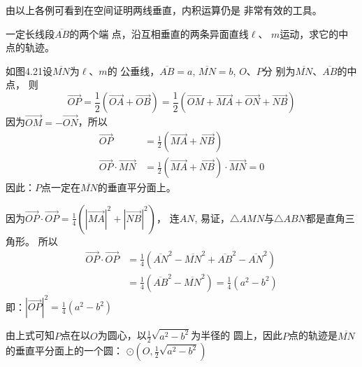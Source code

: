 由以上各例可看到在空间证明两线垂直，内积运算仍是
非常有效的工具。

\begin{example}
    一定长线段$\overline{AB}$的两个端
    点，沿互相垂直的两条异面直线$\ell$、
    $m$运动，求它的中点的轨迹。
\end{example}

\begin{solution}
    如图4.21设$\overline{MN}$为$\ell$、$m$的
公垂线，$\overline{AB}=a$, $\overline{MN}=b$, $O$、$P$分
别为$\overline{MN}$、$\overline{AB}$的中点，
则
\[\Vec{OP}=\frac{1}{2}\left(\Vec{OA}+\Vec{OB}\right)=\frac{1}{2}\left(\Vec{OM}+\Vec{MA}+\Vec{ON}+\Vec{NB}\right)\]
因为$\Vec{OM}=-\Vec{ON}$，所以
\[\begin{split}
    \Vec{OP}&=\frac{1}{2}(\Vec{MA}+\Vec{NB})\\
    \Vec{OP}\cdot\Vec{MN}&=\frac{1}{2}\left(\Vec{MA}+\Vec{NB}\right)\cdot \Vec{MN}=0
\end{split}    \]
因此：$P$点一定在$\overline{MN}$的垂直平分面上。

因为$\Vec{OP}\cdot \Vec{OP}=\frac{1}{4}(|\Vec{MA}|^2+|\Vec{NB}|^2)$，
连$AN$, 易证，$\triangle AMN$与$\triangle ABN$都是直角三角形。
所以
\[\begin{split}
    \Vec{OP}\cdot \Vec{OP}&=\frac{1}{4}\left(\overline{AN}^2-\overline{MN}^2+\overline{AB}^2-\overline{AN}^2\right)\\
    &=\frac{1}{4}\left(\overline{AB}^2-\overline{MN}^2\right)=\frac{1}{4}(a^2-b^2)
\end{split}\]
即：$|\Vec{OP}|^2=\frac{1}{4}(a^2-b^2)$

由上式可知$P$点在以$O$为圆心，以$\frac{1}{2}\sqrt{a^2-b^2}$为半径的
圆上，因此$P$点的轨迹是$\overline{MN}$的垂直平分面上的一个圆：
$\odot\left(O,\frac{1}{2}\sqrt{a^2-b^2}\right)$
\end{solution}

\begin{figure}[htp]\centering
    \begin{minipage}[t]{0.48\textwidth}
    \centering
{}
    \caption{}
    \end{minipage}
    \begin{minipage}[t]{0.48\textwidth}
    \centering
    \caption{}
    \end{minipage}
    \end{figure}

